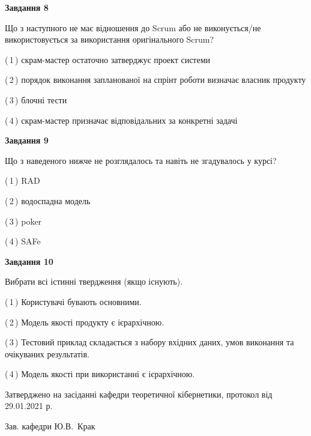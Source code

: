 \documentclass[10pt, ukrainian]{article}
\begin{document}
{\begin {large}
{\begin {center}\textbf{Завдання 8}\end {center}}\par
Що з наступного не має відношення до Scrum або не виконується/не використовується за використання оригінального Scrum?\par
\vspace{2mm}



(\,1\,) скрам-мастер остаточно затверджує проект системи%



(\,2\,) порядок виконання запланованої на спрінт роботи визначає власник продукту%



(\,3\,) блочні тести%



(\,4\,) скрам-мастер призначає відповідальних за конкретні задачі%


{\begin {center}\textbf{Завдання 9}\end {center}}\par
Що з наведеного нижче не розглядалось та навіть не згадувалось у курсі?\par
\vspace{2mm}



(\,1\,) RAD%



(\,2\,) водоспадна модель%



(\,3\,) poker%



(\,4\,) SAFe%


{\begin {center}\textbf{Завдання 10}\end {center}}\par
Вибрати всі істинні твердження (якщо існують).\par
\vspace{2mm}



(\,1\,) Користувачі бувають основними.%



(\,2\,) Модель якості продукту є ієрархічною.%



(\,3\,) Тестовий приклад складається з набору вхідних даних, умов виконання та очікуваних результатів.%



(\,4\,) Модель якості при використанні є ієрархічною.%



\end {large}}
{\vspace{5mm}\smallskip \begin {small} Затверджено на засіданні кафедри теоретичної кібернетики, протокол  від   29.01.2021 р.\par\smallskip\smallskip
{\parbox {6.5 cm}{Зав. кафедри \dotfill Ю.В.~Крак}} \end{small}}
\newpage
\end{document}
